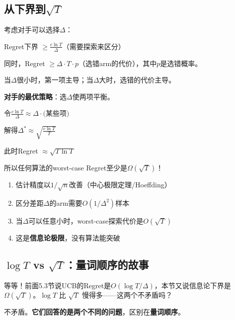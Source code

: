 \documentclass[11pt,a4paper]{article}
\theoremstyle{definition}
\begin{document}
\subsection{从下界到$\sqrt{T}$}

\begin{calculation}
考虑对手可以选择$\Delta$：

Regret下界 $\geq \frac{c \ln T}{\Delta}$（需要探索来区分）

同时，Regret $\geq \Delta \cdot T \cdot p$（选错arm的代价），其中$p$是选错概率。

当$\Delta$很小时，第一项主导；当$\Delta$大时，选错的代价主导。

\textbf{对手的最优策略}：选$\Delta$使两项平衡。

令$\frac{c\ln T}{\Delta} \approx \Delta \cdot \text{(某些项)}$

解得$\Delta^* \approx \sqrt{\frac{c\ln T}{T}}$

此时Regret $\approx \sqrt{T \ln T}$

所以任何算法的worst-case Regret至少是$\Omega(\sqrt{T})$！
\end{calculation}

\begin{keypoint}
\begin{enumerate}
    \item 估计精度以$1/\sqrt{n}$改善（中心极限定理/Hoeffding）
    \item 区分差距$\Delta$的arm需要$O(1/\Delta^2)$样本
    \item 当$\Delta$可以任意小时，worst-case探索代价是$O(\sqrt{T})$
    \item 这是\textbf{信息论极限}，没有算法能突破
\end{enumerate}
\end{keypoint}

\subsection{$\log T$ vs $\sqrt{T}$：量词顺序的故事}

\begin{plainwords}[一个常见的困惑]
等等！前面5.3节说UCB的Regret是$O(\log T / \Delta)$，本节又说信息论下界是$\Omega(\sqrt{T})$。$\log T$ 比 $\sqrt{T}$ 慢得多——这两个不矛盾吗？

不矛盾。\textbf{它们回答的是两个不同的问题}，区别在\textbf{量词顺序}。
\end{plainwords}
\end{document}
